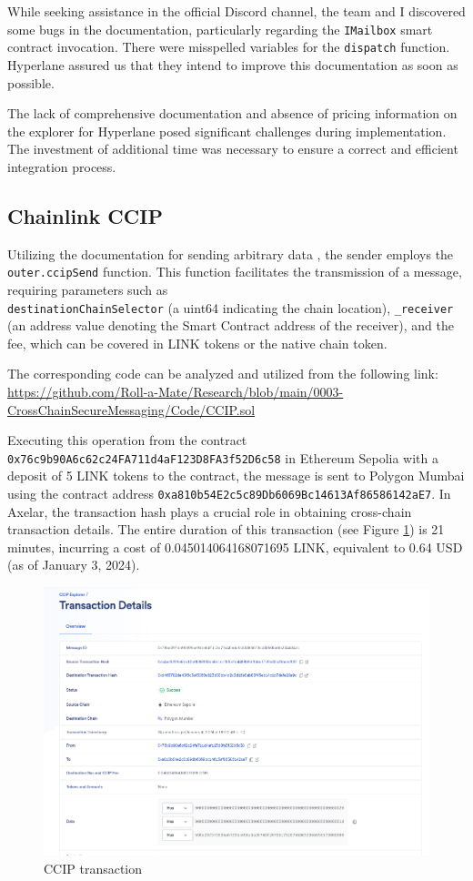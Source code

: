 \documentclass[fleqn,10pt]{olplainarticle}
\begin{document}
While seeking assistance in the official Discord channel, the team and I discovered some bugs in the documentation, particularly regarding the \texttt{IMailbox} smart contract invocation. There were misspelled variables for the \texttt{dispatch} function. Hyperlane assured us that they intend to improve this documentation as soon as possible.

The lack of comprehensive documentation and absence of pricing information on the explorer for Hyperlane posed significant challenges during implementation. The investment of additional time was necessary to ensure a correct and efficient integration process.


\subsection{Chainlink CCIP}

Utilizing the documentation for sending arbitrary data \cite{noauthor_CCIP_nodate}, the sender employs the \texttt{outer.ccipSend} function. This function facilitates the transmission of a message, requiring parameters such as \\ \texttt{destinationChainSelector} (a uint64 indicating the chain location), \texttt{\_receiver} (an address value denoting the Smart Contract address of the receiver), and the fee, which can be covered in LINK tokens or the native chain token.

The corresponding code can be analyzed and utilized from the following link:
\url{https://github.com/Roll-a-Mate/Research/blob/main/0003-CrossChainSecureMessaging/Code/CCIP.sol}

Executing this operation from the contract \\ \texttt{0x76c9b90A6c62c24FA711d4aF123D8FA3f52D6c58} in Ethereum Sepolia with a deposit of 5 LINK tokens to the contract, the message is sent to Polygon Mumbai using the contract address \texttt{0xa810b54E2c5c89Db6069Bc14613Af86586142aE7}. In Axelar, the transaction hash plays a crucial role in obtaining cross-chain transaction details. The entire duration of this transaction (see Figure \ref{fig:ccipethseptomum}) is 21 minutes, incurring a cost of 0.045014064168071695 LINK, equivalent to 0.64 USD (as of January 3, 2024).
 

\begin{figure}[H]
	\centering
	\includegraphics[width=.6\linewidth]{img/CcipEthSepToMum}
	\caption{CCIP transaction}
	\label{fig:ccipethseptomum}
\end{figure}
\end{document}
